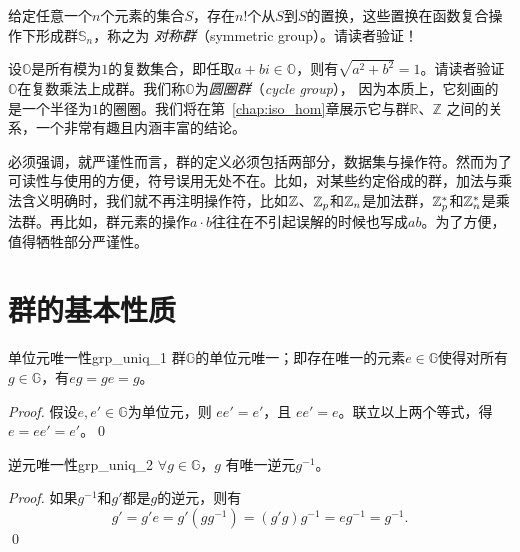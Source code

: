 \begin{example}
\label{exm:sym_gr}
给定任意一个$n$个元素的集合$S$，存在$n!$个从$S$到$S$的置换，这些置换在函数复合操作下形成群$\mathbb{S}_n$，称之为
\emph{对称群}（symmetric group）。请读者验证！
\end{example}
 
 \begin{example}
 \label{exm:cycle_gr}
设$\mathbb{O}$是所有模为$1$的复数集合，即任取$a + b i \in \mathbb{O}$，则有$\sqrt{a^2 + b^2} = 1$。请读者验证
$\mathbb{O}$在复数乘法上成群。我们称$\mathbb{O}$为\emph{圆圈群}（\emph{cycle group}），
因为本质上，它刻画的是一个半径为$1$的圈圈。我们将在第~\ref{chap:iso_hom}章展示它与群$\mathbb{R}$、$\mathbb{Z}$
之间的关系，一个非常有趣且内涵丰富的结论。
 \end{example}
 
必须强调，就严谨性而言，群的定义必须包括两部分，数据集与操作符。然而为了可读性与使用的方便，符号误用无处不在。比如，对某些约定俗成的群，加法与乘法含义明确时，我们就不再注明操作符，比如${\mathbb Z}$、${\mathbb Z}_p$和${\mathbb Z}_n$是加法群，${\mathbb Z}_p^*$和${\mathbb Z}_n^*$是乘法群。再比如，群元素的操作$a \cdot b$往往在不引起误解的时候也写成$ab$。为了方便，值得牺牲部分严谨性。
 
\section{群的基本性质} 
\label{sec:prop_gr}
\begin{proposition}{单位元唯一性}{grp_uniq_1}
群$\mathbb{G}$的单位元唯一；即存在唯一的元素$e \in \mathbb{G}$使得对所有$g\in \mathbb{G}$，有$eg= ge = g$。
\end{proposition}

\begin{proof}
 假设$e, e' \in \mathbb{G}$为单位元，则
 $e e' = e'$，且
 $e e' = e$。联立以上两个等式，得$e = e e' = e'$。\qed
\end{proof}

\begin{proposition}{逆元唯一性}{grp_uniq_2}
		$\forall g \in \mathbb{G}$，$g$ 有唯一逆元$g^{-1}$。
\end{proposition}
	
\begin{proof}
		如果$g^{-1}$和$g'$都是$g$的逆元，则有
		\[ g' = g' e = g' (g g^{-1}) = (g' g)g^{-1} = e g^{-1} = g^{-1}.\]
		 \qed
\end{proof}
	
